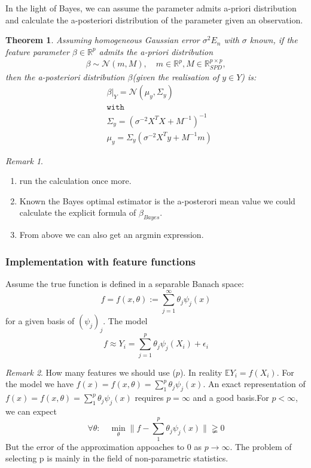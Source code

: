 \documentclass[a4paper,12pt, oneside, fleqn]{book}
\newtheorem{theorem}{Theorem}[section]
\theoremstyle{definition}
\theoremstyle{remark}
\newtheorem*{remark}{Remark}
\begin{document}
In the light of Bayes, we can assume the parameter admits a-priori distribution and calculate the a-posteriori distribution of the parameter given an observation. 
\begin{theorem}
Assuming homogeneous Gaussian error $\sigma^2 E_n$ with $\sigma$ known, if the feature parameter $\beta \in \mathbb{R}^p$ admits the a-priori distribution
\begin{align*}
	\beta \sim \mathcal{N}(m, M), \quad m \in \mathbb{R}^p, M\in \mathbb{R}^{p \times p}_{SPD},
\end{align*} 
then the a-posteriori distribution $\beta$(given the realisation of $y \in Y$) is:
\begin{align*}
    &\beta|_Y = \mathcal{N}(\mu_{y}, \Sigma_{y})\\
    &\texttt{with}\\
    &\Sigma_{y} = (\sigma^{-2} X^T X + M^{-1})^{-1}\\
    &\mu_{y} = \Sigma_{y} (\sigma^{-2}X^T y + M^{-1} m)
\end{align*}
\end{theorem}
\begin{remark}\quad
\begin{enumerate}
    \item run the calculation once more.
    \item Known the Bayes optimal estimator is the a-posterori mean value we could calculate the explicit formula of $\beta_{Bayes}$.
    \item From above we can also get an argmin expression.
\end{enumerate}
\end{remark}


\subsubsection{Implementation with feature functions}
Assume the true function is defined in a separable Banach space:  
\begin{equation*}
	 f =  f(x, \theta) := \sum_{j = 1}^\infty \theta_j \psi_j(x)
\end{equation*}
for a given basis of $(\psi_j)_j$. The model
\begin{equation*}
	f \approx Y_i = \sum_{j = 1}^p \theta_j \psi_j(X_i) + \epsilon_i
\end{equation*}

\begin{remark}
	How many features we should use ($p$). In reality $\mathbb{E} Y_i = f(X_i)$. For the model we have $f(x) = f(x, \theta) = \sum_1^p \theta_j \psi_j(x)$. 
	An exact representation of $f(x) = f(x, \theta) = \sum_1^p \theta_j \psi_j(x)$ requires $p = \infty$ and a good basis.For $p < \infty$, we can expect 
	\begin{equation*}
		 \forall \theta: \quad \min_\theta \| f - \sum_1^p \theta_j \psi_j(x) \| \gneqq 0 
	\end{equation*}
	But the error of the approximation appoaches to 0 as $p \rightarrow \infty$. The problem of selecting p is mainly in the field of non-parametric statistics.
\end{remark}
\end{document}
